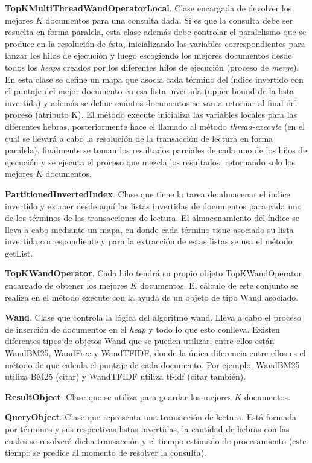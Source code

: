 \begin{list}{}{}
	\item \textbf{TopKMultiThreadWandOperatorLocal}. Clase encargada de devolver los mejores $K$ documentos para una consulta dada. Si es que la consulta debe ser resuelta en forma paralela, esta clase además debe controlar el paralelismo que se produce en la resolución de ésta, inicializando las variables correspondientes para lanzar los hilos de ejecución y luego escogiendo los mejores documentos desde todos los \textit{heaps} creados por los diferentes hilos de ejecución (proceso de \textit{merge}). En esta clase se define un mapa que asocia cada término del índice invertido con el puntaje del mejor documento en esa lista invertida (upper bound de la lista invertida) y además se define cuántos documentos se van a retornar al final del proceso (atributo K). El método execute inicializa las variables locales para las diferentes hebras, posteriormente hace el llamado al método \emph{thread-execute} (en el cual se llevará a cabo la resolución de la transacción de lectura en forma paralela), finalmente se toman los resultados parciales de cada uno de los hilos de ejecución y se ejecuta el proceso que mezcla los resultados, retornando solo los mejores $K$ documentos. 
	
	\item \textbf{PartitionedInvertedIndex}. Clase que tiene la tarea de almacenar el índice invertido y extraer desde aquí las listas invertidas de documentos para cada uno de los términos de las transacciones de lectura. El almacenamiento del índice se lleva a cabo mediante un mapa, en donde cada término tiene asociado su lista invertida correspondiente y para la extracción de estas listas se usa el método getList.
	
	\item \textbf{TopKWandOperator}.  Cada hilo tendrá su propio objeto TopKWandOperator encargado de obtener los mejores $K$ documentos. El cálculo de este conjunto se realiza en el método execute con la ayuda de un objeto de tipo Wand asociado.
	
	\item \textbf{Wand}. Clase que controla la lógica del algoritmo wand. Lleva a cabo el proceso de inserción de documentos en el \textit{heap} y todo lo que esto conlleva. Existen diferentes tipos de objetos Wand que se pueden utilizar, entre ellos están WandBM25, WandFrec y WandTFIDF, donde la única diferencia entre ellos es el método de que calcula el puntaje de cada documento. Por ejemplo, WandBM25 utiliza BM25 (citar) y WandTFIDF utiliza tf-idf (citar también). 
	
	\item \textbf{ResultObject}. Clase que se utiliza para guardar los mejores $K$ documentos.
	
	\item \textbf{QueryObject}. Clase que representa una transacción de lectura. Está formada por términos y sus respectivas listas invertidas, la cantidad de hebras con las cuales se resolverá dicha transacción y el tiempo estimado de procesamiento (este tiempo se predice al momento de resolver la consulta).

\end{list}


